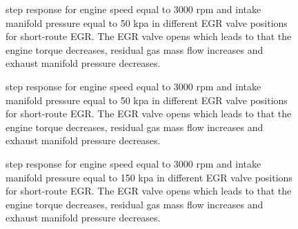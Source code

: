 \begin{figure}[tbp]
  \centering
  \qquad
  \caption{\label{fig:step_response_short_3000_50_1}%
    step response for engine speed equal to 3000 rpm and intake manifold pressure equal to 50 kpa in different EGR valve positions for short-route EGR. The EGR valve opens which leads to that the engine torque decreases, residual gas mass flow increases and exhaust manifold pressure decreases.}
\end{figure}

\begin{figure}[tbp]
  \centering
  \qquad
  \caption{\label{fig:step_response_short_3000_50_2}%
    step response for engine speed equal to 3000 rpm and intake manifold pressure equal to 50 kpa in different EGR valve positions for short-route EGR. The EGR valve opens which leads to that the engine torque decreases, residual gas mass flow increases and exhaust manifold pressure decreases.}
\end{figure}

\begin{figure}[tbp]
  \centering
  \qquad
  \caption{\label{fig:step_response_short_3000_150_1}%
    step response for engine speed equal to 3000 rpm and intake manifold pressure equal to 150 kpa in different EGR valve positions for short-route EGR. The EGR valve opens which leads to that the engine torque decreases, residual gas mass flow increases and exhaust manifold pressure decreases.}
\end{figure}

